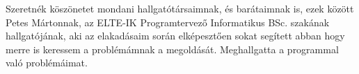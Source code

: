 \documentclass[
]{elteikthesis}[2022/04/30]
\begin{document}
Szeretnék köszönetet mondani hallgatótársaimnak, és barátaimnak is, ezek között Petes Mártonnak, az ELTE-IK Programtervező Informatikus BSc. szakának hallgatójának, aki az elakadásaim során elképesztően sokat segített abban hogy merre is keressem a problémámnak a megoldását. Meghallgatta a programmal való problémáimat. 

\printbibliography[title=\biblabel]
\cleardoublepage{}

{}
\listoffigures
\cleardoublepage

\listoftables
\cleardoublepage{}

\lstlistoflistings{}
\cleardoublepage{}

\end{document}
